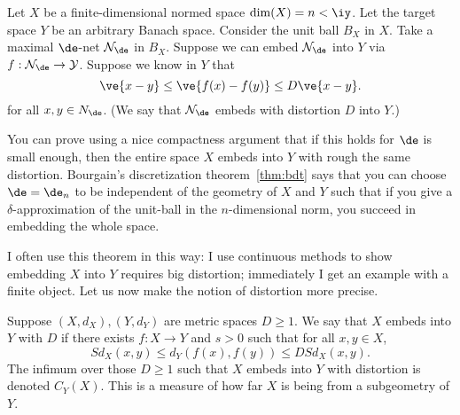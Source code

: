 \begin{df}
Let $X$ be a finite-dimensional normed space $\dim(X)=n<\iy$. Let the target space $Y$ be an arbitrary Banach space.  Consider the unit ball $B_X$ in $X$. Take %
a maximal $\de$-net $\cal N_\de$ in $B_X$. %
Suppose we can embed $\cal N_\de$ into $Y$ via $f:\cal N_\de\to Y$. Suppose we know in $Y$ that
\[
\ve{x-y}\le \ve{f(x)-f(y)}\le D\ve{x-y}.
\]
for all $x, y \in N_{\de}$. 
(We say that $\cal N_\de$ embeds with distortion $D$ into $Y$.)
\end{df}
You can prove using a nice compactness argument that if this holds for $\de$ is small enough, then the entire space $X$ embeds into $Y$ with rough the same distortion. 
Bourgain's discretization theorem~\ref{thm:bdt} says that you can choose $\de=\de_n$ to be independent of the geometry of $X$ and $Y$ such that if you give a $\delta$-approximation of the unit-ball in the $n$-dimensional norm, you succeed in embedding the whole space. 

I often use this theorem in this way: I use continuous methods to show embedding $X$ into $Y$ requires big distortion; immediately I get an example with a finite object. Let us now make the notion of distortion more precise. 

\begin{df}[Distortion]
Suppose $(X,d_X),(Y,d_Y)$ are metric spaces $D\ge 1$. We say that $X$ embeds into $Y$ with  $D$ if there exists $f:X\to Y$ and $s>0$ such that for all $x,y\in X$,
\[
Sd_X(x,y) \le d_Y(f(x),f(y)) \le DSd_X(x,y).
\]
The infimum over those $D\ge 1$ such that $X$ embeds into $Y$ with distortion is denoted $C_Y(X)$. This is a measure of how far $X$ is being from a subgeometry of $Y$. 
\end{df}

